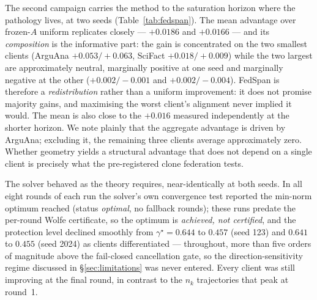 \documentclass[sigconf,anonymous,review]{acmart}
\begin{document}
The second campaign carries the method to the saturation horizon where the pathology lives, at two seeds (Table~\ref{tab:fedspan}). The mean advantage over frozen-$A$ uniform replicates closely --- $+0.0186$ and $+0.0166$ --- and its \emph{composition} is the informative part: the gain is concentrated on the two smallest clients (ArguAna $+0.053/+0.063$, SciFact $+0.018/+0.009$) while the two largest are approximately neutral, marginally positive at one seed and marginally negative at the other ($+0.002/-0.001$ and $+0.002/-0.004$). FedSpan is therefore a \emph{redistribution} rather than a uniform improvement: it does not promise majority gains, and maximising the worst client's alignment never implied it would. The mean is also close to the $+0.016$ measured independently at the shorter horizon. We note plainly that the aggregate advantage is driven by ArguAna; excluding it, the remaining three clients average approximately zero. Whether geometry yields a structural advantage that does not depend on a single client is precisely what the pre-registered clone federation tests.

The solver behaved as the theory requires, near-identically at both seeds. In all eight rounds of each run the solver's own convergence test reported the min-norm optimum reached (status \emph{optimal}, no fallback rounds); these runs predate the per-round Wolfe certificate, so the optimum is \emph{achieved, not certified}, and the protection level declined smoothly from $\gamma^\star = 0.644$ to $0.457$ (seed 123) and $0.641$ to $0.455$ (seed 2024) as clients differentiated --- throughout, more than five orders of magnitude above the fail-closed cancellation gate, so the direction-sensitivity regime discussed in \S\ref{sec:limitations} was never entered. Every client was still improving at the final round, in contrast to the $n_k$ trajectories that peak at round~1.
\end{document}
